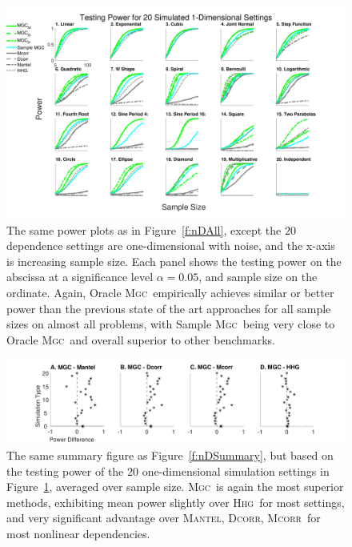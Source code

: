 \documentclass[11pt]{article}
\providecommand{\sct}[1]{{\normalfont\textsc{#1}}}
\newcommand{\Mgc}{\sct{Mgc}}
\newcommand{\Hhg}{\sct{Hhg}}
\newcommand{\Dcorr}{\sct{Dcorr}}
\newcommand{\Mcorr}{\sct{Mcorr}}
\newcommand{\Mantel}{\sct{Mantel}}
\begin{document}
\begin{figure}[htbp]
\includegraphics[width=1.0\textwidth,trim={0 0.5cm 4cm 0},clip]{Figures/Fig1DPowerAll}
\caption{
The same power plots as in Figure~\ref{f:nDAll}, except the $20$ dependence settings are one-dimensional with noise, and the x-axis is increasing sample size.
Each panel shows the testing power on the abscissa at a significance level $\alpha=0.05$, and sample size on the ordinate.
Again, Oracle \Mgc~empirically achieves similar or better power than the previous state of the art approaches for all sample sizes on almost all problems, with Sample \Mgc~being very close to Oracle \Mgc~and overall superior to other benchmarks.}
\label{f:1DAll}
\end{figure}

\begin{figure}
  \centering
  \includegraphics[width=1.0\textwidth,trim={3.5cm 0 3.5cm 0},clip]{Figures/Fig1DPowerMGCM}
  \caption{The same summary figure as Figure~\ref{f:nDSummary}, but based on the testing power of the $20$ one-dimensional simulation settings in Figure~\ref{f:1DAll}, averaged over sample size. 
  \Mgc~is again the most superior methods, exhibiting mean power slightly over \Hhg~for most settings, and very significant advantage over \Mantel, \Dcorr, \Mcorr~for most nonlinear dependencies.}
\label{f:1DSummary}
\end{figure}
\end{document}
